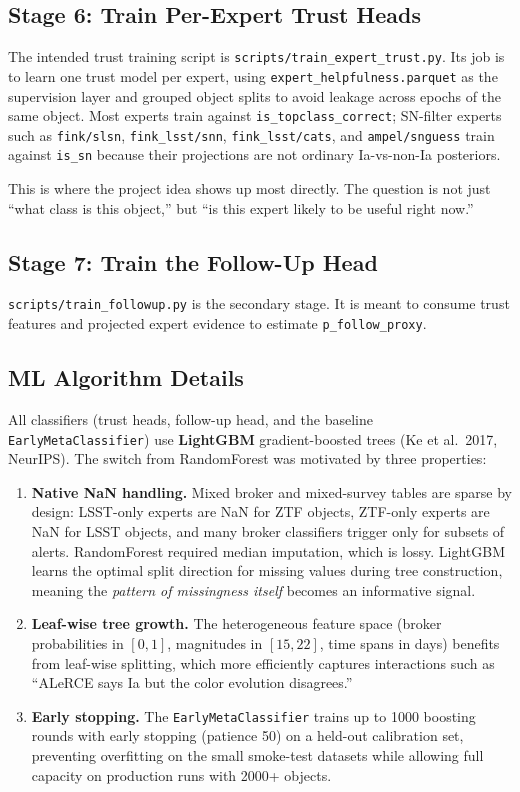 \documentclass[11pt]{article}
\newcommand{\code}[1]{\texttt{#1}}
\begin{document}
\subsection{Stage 6: Train Per-Expert Trust Heads}

The intended trust training script is \code{scripts/train\_expert\_trust.py}. Its job is to learn one trust model per expert, using \code{expert\_helpfulness.parquet} as the supervision layer and grouped object splits to avoid leakage across epochs of the same object. Most experts train against \code{is\_topclass\_correct}; SN-filter experts such as \code{fink/slsn}, \code{fink\_lsst/snn}, \code{fink\_lsst/cats}, and \code{ampel/snguess} train against \code{is\_sn} because their projections are not ordinary Ia-vs-non-Ia posteriors.

This is where the project idea shows up most directly. The question is not just ``what class is this object,'' but ``is this expert likely to be useful right now.''

\subsection{Stage 7: Train the Follow-Up Head}

\code{scripts/train\_followup.py} is the secondary stage. It is meant to consume trust features and projected expert evidence to estimate \code{p\_follow\_proxy}.

\subsection{ML Algorithm Details}

All classifiers (trust heads, follow-up head, and the baseline \code{EarlyMetaClassifier}) use \textbf{LightGBM} gradient-boosted trees (Ke et al.\ 2017, NeurIPS). The switch from RandomForest was motivated by three properties:

\begin{enumerate}
\item \textbf{Native NaN handling.} Mixed broker and mixed-survey tables are sparse by design: LSST-only experts are NaN for ZTF objects, ZTF-only experts are NaN for LSST objects, and many broker classifiers trigger only for subsets of alerts. RandomForest required median imputation, which is lossy. LightGBM learns the optimal split direction for missing values during tree construction, meaning the \emph{pattern of missingness itself} becomes an informative signal.

\item \textbf{Leaf-wise tree growth.} The heterogeneous feature space (broker probabilities in $[0,1]$, magnitudes in $[15,22]$, time spans in days) benefits from leaf-wise splitting, which more efficiently captures interactions such as ``ALeRCE says Ia but the color evolution disagrees.''

\item \textbf{Early stopping.} The \code{EarlyMetaClassifier} trains up to 1000 boosting rounds with early stopping (patience 50) on a held-out calibration set, preventing overfitting on the small smoke-test datasets while allowing full capacity on production runs with 2000+ objects.
\end{enumerate}
\end{document}
